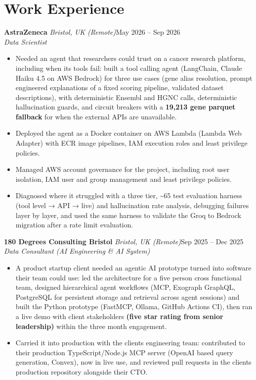 \documentclass[a4paper,11pt]{article}
\newcommand{\role}[4]{%
  \textbf{#1}{\color{muted}\,\textperiodcentered\,\textit{#2}}\hfill{\color{muted}#3}\\
  \textit{#4}\par}
\newcommand{\gap}{\vspace{5pt}}
\newcommand{\num}[1]{\textbf{#1}}   %
\begin{document}
\section{Work Experience}
\role{AstraZeneca}{Bristol, UK (Remote)}{May 2026 – Sep 2026}{Data Scientist}
\begin{itemize}
  \item Needed an agent that researchers could trust on a cancer research platform, including when its tools fail: built a tool calling agent (LangChain, Claude Haiku 4.5 on AWS Bedrock) for three use cases (gene alias resolution, prompt engineered explanations of a fixed scoring pipeline, validated dataset descriptions), with deterministic Ensembl and HGNC calls, deterministic hallucination guards, and circuit breakers with a \num{19,213 gene parquet fallback} for when the external APIs are unavailable.
  \item Deployed the agent as a Docker container on AWS Lambda (Lambda Web Adapter) with ECR image pipelines, IAM execution roles and least privilege policies.
  \item Managed AWS account governance for the project, including root user isolation, IAM user and group management and least privilege policies.
  \item Diagnosed where it struggled with a three tier, \textasciitilde{}65 test evaluation harness (tool level → API → live) and hallucination rate analysis, debugging failures layer by layer, and used the same harness to validate the Groq to Bedrock migration after a rate limit evaluation.
\end{itemize}
\gap
{}
\role{180 Degrees Consulting Bristol}{Bristol, UK (Remote)}{Sep 2025 – Dec 2025}{Data Consultant (AI Engineering \& AI System)}
\begin{itemize}
  \item A product startup client needed an agentic AI prototype turned into software their team could use: led the architecture for a five person cross functional team, designed hierarchical agent workflows (MCP, Exograph GraphQL, PostgreSQL for persistent storage and retrieval across agent sessions) and built the Python prototype (FastMCP, Ollama, GitHub Actions CI), then ran a live demo with client stakeholders \num{(five star rating from senior leadership)} within the three month engagement.
  \item Carried it into production with the client\textquotesingle{}s engineering team: contributed to their production TypeScript/Node.js MCP server (OpenAI based query generation, Convex), now in live use, and reviewed pull requests in the client\textquotesingle{}s production repository alongside their CTO.
\end{itemize}
\end{document}
